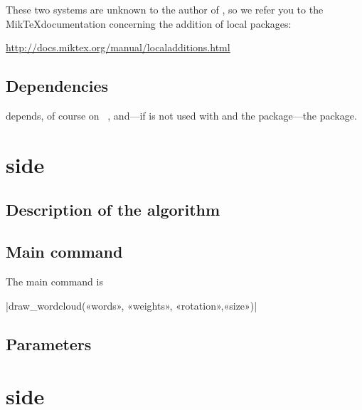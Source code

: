 \documentclass[english]{ltxdoc}
\begin{document}
These two systems are unknown to the author of \wordcloudpkg, so we
refer you to the Mik\TeX documentation concerning the addition of local packages:
\begin{center}
  \url{http://docs.miktex.org/manual/localadditions.html}
\end{center}



\subsection{Dependencies}


\wordcloudpkg depends, of course on \MP~\cite{ctan-metapost}, and---if \wordcloudpkg
is not used with  and the  package---the
 package. 

\section{ side}

\subsection{Description of the algorithm}

\subsection{Main command}

The main command is 

\commande|draw_wordcloud(«words», «weights», «rotation»,«size»)|\smallskip{}
\subsection{Parameters}

\section{ side}
\end{document}
